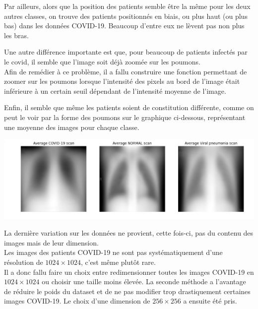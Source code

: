 \documentclass{article}
\begin{document}
	\par Par ailleurs, alors que la position des patients semble être la même pour les deux autres classes, on trouve des patients positionnés en biais, ou plus haut (ou plus bas) dans les données COVID-19. Beaucoup d'entre eux ne lèvent pas non plus les bras.
	
	\par Une autre différence importante est que, pour beaucoup de patients infectés par le covid, il semble que l'image soit déjà zoomée sur les poumons.\\
	Afin de remédier à ce problème, il a fallu construire une fonction permettant de zoomer sur les poumons lorsque l'intensité des pixels au bord de l'image était inférieure à un certain seuil dépendant de l'intensité moyenne de l'image.
	
	\par Enfin, il semble que même les patients soient de constitution différente, comme on peut le voir par la forme des poumons sur le graphique ci-dessous, représentant une moyenne des images pour chaque classe.
	
    \begin{center}
         
    \includegraphics[scale=0.5]{avg_img.png} 
    
	\end{center}
    
    \par La dernière variation sur les données ne provient, cette fois-ci, pas du contenu des images mais de leur dimension.\\
    Les images des patients COVID-19 ne sont pas systématiquement d'une résolution de $1024 \times 1024$, c'est même plutôt rare.\\
    Il a donc fallu faire un choix entre redimensionner toutes les images COVID-19 en $1024 \times 1024$ ou choisir une taille moins élevée. La seconde méthode a l'avantage de réduire le poids du dataset et de ne pas modifier trop drastiquement certaines images COVID-19. Le choix d'une dimension de $256 \times 256$ a ensuite été pris.
	
\end{document}
